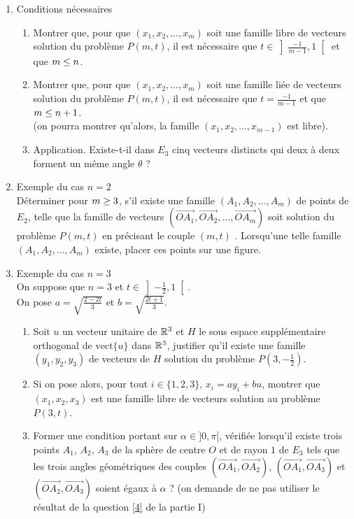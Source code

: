 \begin{enumerate}
\begin{enumerate}
                                  \end{enumerate}
    \item Conditions nécessaires
    \begin{enumerate}
      \item Montrer que, pour que $(x_1,x_2,\dots,x_m)$ soit une
      famille libre de vecteurs solution du problème $P(m,t)$, il
      est nécessaire que $t\in\left]\frac{-1}{m-1},1\right[$ et que
      $m\leq n$.
      \item Montrer que, pour que $(x_1,x_2,\dots,x_m)$ soit une
      famille liée de vecteurs solution du problème $P(m,t)$, il
      est nécessaire que $t=\frac{-1}{m-1}$ et que $m\leq n+1$.\\
      (on pourra montrer qu'alors, la famille
      $(x_1,x_2,\dots,x_{m-1})$ est libre).
      \item Application. Existe-t-il dans $E_3$ cinq vecteurs distincts qui deux à deux forment un même angle  $\theta$ ?
    \end{enumerate}
    \item  Exemple du cas $n=2$\\
    Déterminer pour $m\geq 3$, s'il existe une famille $(A_1,A_2,\dots, A_m)$ de
    points de $E_2$, telle que la famille de vecteurs
    $(\overrightarrow{OA_1},\overrightarrow{OA_2},\dots,\overrightarrow{OA_m})$
    soit solution du problème $P(m,t)$ en précisant le couple
    $(m,t)$ . Lorsqu'une telle famille $(A_1,A_2,\dots,A_m)$ existe, placer ces points sur une figure.
    \item Exemple du cas $n=3$\\
    On suppose que $n=3$ et $t\in\left]-\frac12,1\right[$.\\
    On pose $a=\sqrt{\frac{2-2t}{3}}$ et $b=\sqrt{\frac{2t+1}{3}}$.
    \begin{enumerate}
      \item Soit $u$ un vecteur unitaire de $\mathbb{R}^3$ et $H$ le sous
      espace supplémentaire orthogonal de $\text{vect}\{u\}$ dans $\mathbb{R}^3$,
      justifier qu'il existe une famille $(y_1,y_2,y_3)$ de vecteurs
      de $H$ solution du problème $P(3,-\frac 12)$.
      \item Si on pose alors, pour tout $i\in\{1,2,3\}$,
      $x_i=ay_i+bu$, montrer que $(x_1,x_2,x_3)$ est une famille
      libre de vecteurs solution au problème $P(3,t)$.
      \item Former une condition portant sur $\alpha\in]0,\pi[$, vérifiée lorsqu'il existe trois points $A_1$, $A_2$, $A_3$ de la sphère de centre $O$ et de rayon $1$ de $E_3$ tels que les trois angles géométriques des couples $(\overrightarrow{OA_1},\overrightarrow{OA_2})$,       $(\overrightarrow{OA_1},\overrightarrow{OA_3})$ et $(\overrightarrow{OA_2},\overrightarrow{OA_3})$
      soient égaux à $\alpha$ ? 
      (on demande de ne pas utiliser le résultat de la question \ref{4} de la partie I)
    \end{enumerate}
  \end{enumerate}

